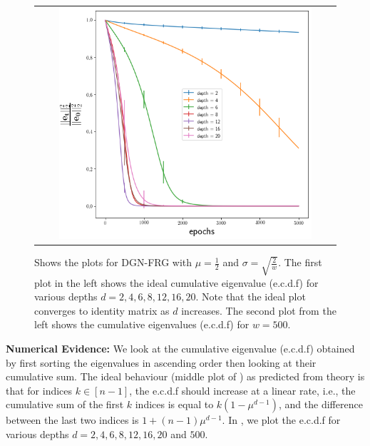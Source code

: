 \begin{figure}
{\begin{tabular}{ccccc}
&
&
\includegraphics[scale=0.4]{figs/dgn-fra-conv-w500.png}
\end{tabular}
}
\caption{Shows the plots for DGN-FRG with $\mu=\frac{1}{2}$ and $\sigma=\sqrt{\frac{2}{w}}$. The first plot in the left shows the ideal cumulative eigenvalue (e.c.d.f) for various depths $d=2,4,6,8,12,16,20$. Note that the ideal plot converges to identity matrix as $d$ increases. The second plot from the left shows the cumulative eigenvalues (e.c.d.f) for $w=500$. }
\label{fig:dgn-frg-gram-ecdf}
\end{figure}
\textbf{Numerical Evidence:} We look at the cumulative eigenvalue (e.c.d.f) obtained by first sorting the eigenvalues in ascending order then looking at their cumulative sum. The ideal behaviour (middle plot of ) as predicted from theory is that for indices $k\in[n-1]$, the e.c.d.f should increase at a linear rate, i.e., the cumulative sum of the first $k$ indices is equal to $k(1-\mu^{d-1})$, and the difference between the last two indices is $1+(n-1)\mu^{d-1}$. In , we plot the e.c.d.f for various depths $d=2,4,6,8,12,16,20$ and $500$. 

